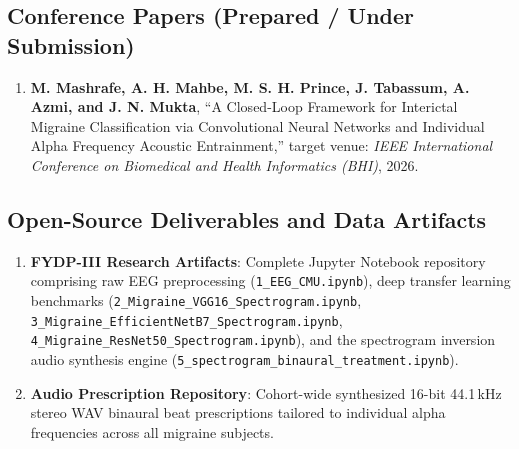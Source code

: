 \documentclass[12pt, a4paper]{report}
\begin{document}
\subsection*{Conference Papers (Prepared / Under Submission)}
\begin{enumerate}
    \item \textbf{M. Mashrafe, A. H. Mahbe, M. S. H. Prince, J. Tabassum, A. Azmi, and J. N. Mukta}, ``A Closed-Loop Framework for Interictal Migraine Classification via Convolutional Neural Networks and Individual Alpha Frequency Acoustic Entrainment,'' target venue: \textit{IEEE International Conference on Biomedical and Health Informatics (BHI)}, 2026.
\end{enumerate}


\subsection*{Open-Source Deliverables and Data Artifacts}
\begin{enumerate}
    \item \textbf{FYDP-III Research Artifacts}: Complete Jupyter Notebook repository comprising raw EEG preprocessing (\nolinkurl{1_EEG_CMU.ipynb}), deep transfer learning benchmarks (\nolinkurl{2_Migraine_VGG16_Spectrogram.ipynb}, \nolinkurl{3_Migraine_EfficientNetB7_Spectrogram.ipynb}, \nolinkurl{4_Migraine_ResNet50_Spectrogram.ipynb}), and the spectrogram inversion audio synthesis engine (\nolinkurl{5_spectrogram_binaural_treatment.ipynb}).
    \item \textbf{Audio Prescription Repository}: Cohort-wide synthesized 16-bit 44.1\,kHz stereo WAV binaural beat prescriptions tailored to individual alpha frequencies across all migraine subjects.
\end{enumerate}

\newpage

\tableofcontents
\newpage

\listoffigures
{}
\newpage

\listoftables
{}
\newpage

\end{document}
